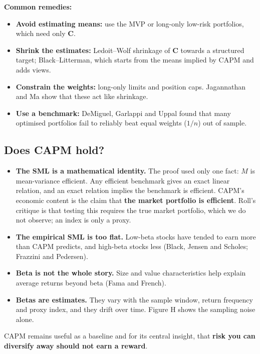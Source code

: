 \documentclass[titlepage,11pt,a4paper]{article}
\newcommand{\vC}{\boldsymbol{C}}
\begin{document}
\textbf{Common remedies:}
\begin{itemize}
  \item \textbf{Avoid estimating means:} use the MVP or long-only low-risk portfolios, which need only $\vC$.
  \item \textbf{Shrink the estimates:} Ledoit--Wolf shrinkage of $\vC$ towards a structured target; Black--Litterman, which starts from the means implied by CAPM and adds views.
  \item \textbf{Constrain the weights:} long-only limits and position caps. Jagannathan and Ma show that these act like shrinkage.
  \item \textbf{Use a benchmark:} DeMiguel, Garlappi and Uppal found that many optimised portfolios fail to reliably beat equal weights ($1/n$) out of sample.
\end{itemize}

\subsection{Does CAPM hold?}
\begin{itemize}
  \item \textbf{The SML is a mathematical identity.} The proof used only one fact: $M$ is mean-variance efficient. Any efficient benchmark gives an exact linear relation, and an exact relation implies the benchmark is efficient. CAPM's economic content is the claim that \textbf{the market portfolio is efficient}. Roll's critique is that testing this requires the true market portfolio, which we do not observe; an index is only a proxy.
  \item \textbf{The empirical SML is too flat.} Low-beta stocks have tended to earn more than CAPM predicts, and high-beta stocks less (Black, Jensen and Scholes; Frazzini and Pedersen).
  \item \textbf{Beta is not the whole story.} Size and value characteristics help explain average returns beyond beta (Fama and French).
  \item \textbf{Betas are estimates.} They vary with the sample window, return frequency and proxy index, and they drift over time. Figure H shows the sampling noise alone.
\end{itemize}
CAPM remains useful as a baseline and for its central insight, that \textbf{risk you can diversify away should not earn a reward}.
\end{document}
